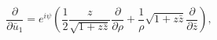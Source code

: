 \begin{equation}
\frac{\partial}{\partial \bar{u}_{1}}= e^{i\psi} (\frac{1}{2} \frac{z}{\sqrt{1+z\bar{z}}}
\frac{\partial}{\partial \rho}+\frac{1}{\rho} \sqrt{1+z\bar{z}} \frac{\partial}{\partial \bar{z}}),  
              \label{6.16a}
\end{equation}

